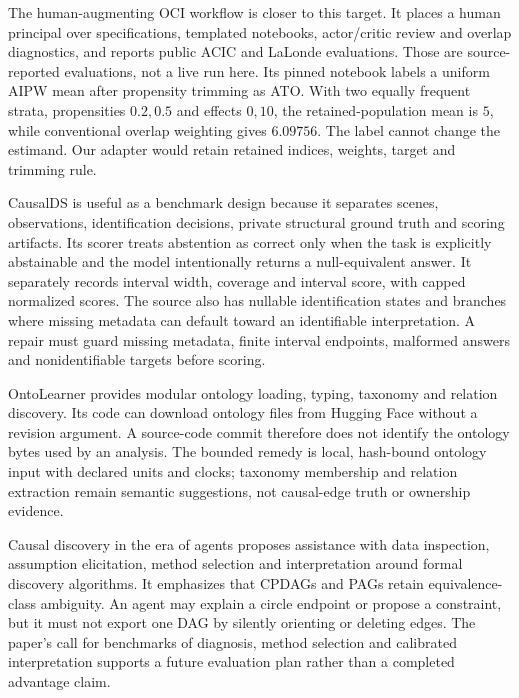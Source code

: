 The human-augmenting OCI workflow is closer to this target. It places a human principal over specifications, templated notebooks, actor/critic review and overlap diagnostics, and reports public ACIC and LaLonde evaluations. Those are source-reported evaluations, not a live run here. Its pinned notebook labels a uniform AIPW mean after propensity trimming as ATO. With two equally frequent strata, propensities $0.2,0.5$ and effects $0,10$, the retained-population mean is $5$, while conventional overlap weighting gives $6.09756$. The label cannot change the estimand. Our adapter would retain retained indices, weights, target and trimming rule.\cite{exec13_data_oci,exec13_data_oci_code}

CausalDS is useful as a benchmark design because it separates scenes, observations, identification decisions, private structural ground truth and scoring artifacts. Its scorer treats abstention as correct only when the task is explicitly abstainable and the model intentionally returns a null-equivalent answer. It separately records interval width, coverage and interval score, with capped normalized scores. The source also has nullable identification states and branches where missing metadata can default toward an identifiable interpretation. A repair must guard missing metadata, finite interval endpoints, malformed answers and nonidentifiable targets before scoring.\cite{exec13_data_causalds,exec13_data_causalds_code}

OntoLearner provides modular ontology loading, typing, taxonomy and relation discovery. Its code can download ontology files from Hugging Face without a revision argument. A source-code commit therefore does not identify the ontology bytes used by an analysis. The bounded remedy is local, hash-bound ontology input with declared units and clocks; taxonomy membership and relation extraction remain semantic suggestions, not causal-edge truth or ownership evidence.\cite{exec13_data_ontolearner,exec13_data_ontolearner_code}

Causal discovery in the era of agents proposes assistance with data inspection, assumption elicitation, method selection and interpretation around formal discovery algorithms. It emphasizes that CPDAGs and PAGs retain equivalence-class ambiguity. An agent may explain a circle endpoint or propose a constraint, but it must not export one DAG by silently orienting or deleting edges. The paper's call for benchmarks of diagnosis, method selection and calibrated interpretation supports a future evaluation plan rather than a completed advantage claim.\cite{exec13_data_causaldiscovery}

